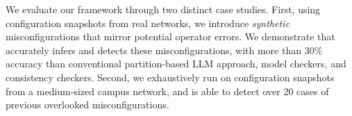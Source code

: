 We evaluate our framework through two distinct case studies.
First, using configuration snapshots from real networks, we introduce {\em synthetic} misconfigurations that mirror potential operator errors. 
We demonstrate that \sysname{} accurately infers and detects these misconfigurations, with more than 30\%
accuracy than conventional partition-based LLM approach, model checkers, and consistency checkers.
Second, we exhaustively run \sysname{} on configuration snapshots from a medium-sized campus network, and \sysname{} is able to detect over 20 cases of previous overlooked misconfigurations.
